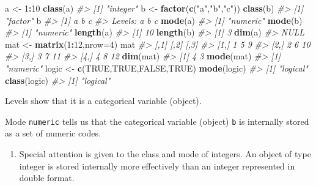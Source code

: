 \documentclass[
]{book}
\newenvironment{Shaded}{\begin{snugshade}}{\end{snugshade}}
\newcommand{\AttributeTok}[1]{\textcolor[rgb]{0.13,0.29,0.53}{#1}}
\newcommand{\CommentTok}[1]{\textcolor[rgb]{0.56,0.35,0.01}{\textit{#1}}}
\newcommand{\ConstantTok}[1]{\textcolor[rgb]{0.56,0.35,0.01}{#1}}
\newcommand{\DecValTok}[1]{\textcolor[rgb]{0.00,0.00,0.81}{#1}}
\newcommand{\FunctionTok}[1]{\textcolor[rgb]{0.13,0.29,0.53}{\textbf{#1}}}
\newcommand{\NormalTok}[1]{#1}
\newcommand{\OtherTok}[1]{\textcolor[rgb]{0.56,0.35,0.01}{#1}}
\newcommand{\SpecialCharTok}[1]{\textcolor[rgb]{0.81,0.36,0.00}{\textbf{#1}}}
\newcommand{\StringTok}[1]{\textcolor[rgb]{0.31,0.60,0.02}{#1}}
\providecommand{\tightlist}{%
  \setlength{\itemsep}{0pt}\setlength{\parskip}{0pt}}
\begin{document}
\begin{Shaded}
\begin{Highlighting}[]
\NormalTok{a }\OtherTok{\textless{}{-}} \DecValTok{1}\SpecialCharTok{:}\DecValTok{10}
\FunctionTok{class}\NormalTok{(a)}
\CommentTok{\#\textgreater{} [1] "integer"}
\NormalTok{b }\OtherTok{\textless{}{-}} \FunctionTok{factor}\NormalTok{(}\FunctionTok{c}\NormalTok{(}\StringTok{"a"}\NormalTok{,}\StringTok{"b"}\NormalTok{,}\StringTok{"c"}\NormalTok{))}
\FunctionTok{class}\NormalTok{(b)}
\CommentTok{\#\textgreater{} [1] "factor"}
\NormalTok{b}
\CommentTok{\#\textgreater{} [1] a b c}
\CommentTok{\#\textgreater{} Levels: a b c}
\FunctionTok{mode}\NormalTok{(a)}
\CommentTok{\#\textgreater{} [1] "numeric"}
\FunctionTok{mode}\NormalTok{(b)}
\CommentTok{\#\textgreater{} [1] "numeric"}
\FunctionTok{length}\NormalTok{(a)}
\CommentTok{\#\textgreater{} [1] 10}
\FunctionTok{length}\NormalTok{(b)}
\CommentTok{\#\textgreater{} [1] 3}
\FunctionTok{dim}\NormalTok{(a)}
\CommentTok{\#\textgreater{} NULL}
\NormalTok{mat }\OtherTok{\textless{}{-}} \FunctionTok{matrix}\NormalTok{(}\DecValTok{1}\SpecialCharTok{:}\DecValTok{12}\NormalTok{,}\AttributeTok{nrow=}\DecValTok{4}\NormalTok{)}
\NormalTok{mat}
\CommentTok{\#\textgreater{}      [,1] [,2] [,3]}
\CommentTok{\#\textgreater{} [1,]    1    5    9}
\CommentTok{\#\textgreater{} [2,]    2    6   10}
\CommentTok{\#\textgreater{} [3,]    3    7   11}
\CommentTok{\#\textgreater{} [4,]    4    8   12}
\FunctionTok{dim}\NormalTok{(mat)}
\CommentTok{\#\textgreater{} [1] 4 3}
\FunctionTok{mode}\NormalTok{(mat)}
\CommentTok{\#\textgreater{} [1] "numeric"}
\NormalTok{logic }\OtherTok{\textless{}{-}} \FunctionTok{c}\NormalTok{(}\ConstantTok{TRUE}\NormalTok{,}\ConstantTok{TRUE}\NormalTok{,}\ConstantTok{FALSE}\NormalTok{,}\ConstantTok{TRUE}\NormalTok{)}
\FunctionTok{mode}\NormalTok{(logic)}
\CommentTok{\#\textgreater{} [1] "logical"}
\FunctionTok{class}\NormalTok{(logic)}
\CommentTok{\#\textgreater{} [1] "logical"}
\end{Highlighting}
\end{Shaded}

Levels show that it is a categorical variable (object).

Mode \texttt{numeric} tells us that the categorical variable (object) \texttt{b} is internally stored as a set of numeric codes.

\begin{enumerate}
\def\labelenumi{(\alph{enumi})}
\setcounter{enumi}{4}
\tightlist
\item
  Special attention is given to the class and mode of integers. An object of type integer is stored internally more effectively than an integer represented in double format.
\end{enumerate}
\end{document}
